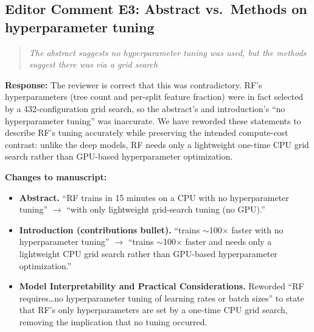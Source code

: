 \documentclass[11pt]{article}
\newenvironment{reviewer}{%
  \begin{quote}\itshape\color{black!70}}{%
  \end{quote}}
\newcommand{\response}[1]{\noindent\textbf{Response:} #1\par\medskip}
\newenvironment{changes}{%
  \noindent\textbf{Changes to manuscript:}
  \begin{itemize}[leftmargin=2em,itemsep=2pt]}{%
  \end{itemize}\medskip}
\begin{document}
\subsection*{Editor Comment E3: Abstract vs.\ Methods on hyperparameter tuning}
\begin{reviewer}
The abstract suggests no hyperparameter tuning was used, but the methods suggest there was via a grid search
\end{reviewer}
\response{The reviewer is correct that this was contradictory. RF's hyperparameters (tree count and per-split feature fraction) were in fact selected by a 432-configuration grid search, so the abstract's and introduction's ``no hyperparameter tuning'' was inaccurate. We have reworded these statements to describe RF's tuning accurately while preserving the intended compute-cost contrast: unlike the deep models, RF needs only a lightweight one-time CPU grid search rather than GPU-based hyperparameter optimization.}
\begin{changes}
  \item \textbf{Abstract.} ``RF trains in 15 minutes on a CPU with no hyperparameter tuning'' $\rightarrow$ ``with only lightweight grid-search tuning (no GPU).''
  \item \textbf{Introduction (contributions bullet).} ``trains $\sim$100$\times$ faster with no hyperparameter tuning'' $\rightarrow$ ``trains $\sim$100$\times$ faster and needs only a lightweight CPU grid search rather than GPU-based hyperparameter optimization.''
  \item \textbf{Model Interpretability and Practical Considerations.} Reworded ``RF requires\ldots no hyperparameter tuning of learning rates or batch sizes'' to state that RF's only hyperparameters are set by a one-time CPU grid search, removing the implication that no tuning occurred.
\end{changes}
\end{document}
